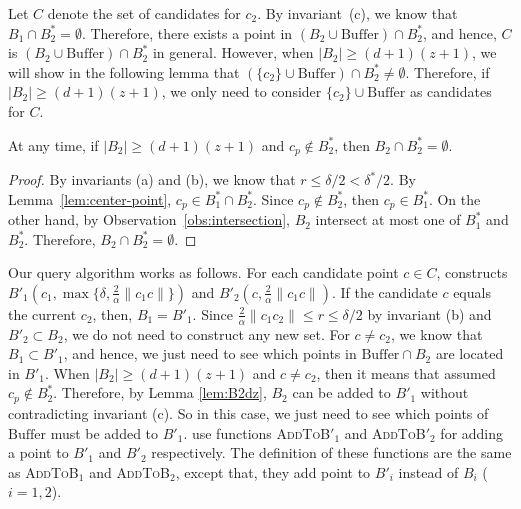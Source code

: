 \documentclass[envcountsame]{cls/cccg15}
\newcommand{\cp}{c_p}
\newcommand{\dz}{(d + 1)(z + 1)}
\newcommand{\Buffer}{\ensuremath{\text{Buffer}}}
\newcommand{\textproc}{\textsc}
\newcommand{\len}[1]{\|{#1}\|}
\newcommand{\radius}[1]{\frac{2}{\alpha} \len{c_1 #1}}
\newcommand{\lee}{\leqslant}
\newcommand{\gee}{\geqslant}
\renewcommand{\leq}{\lee}
\renewcommand{\geq}{\gee}
\renewcommand{\ge}{\gee}
\begin{document}
Let $C$ denote the set of candidates for $c_2$.
By invariant~(c), we know that $B_1 \cap B_2^* = \emptyset$. 
Therefore, there exists a point in $(B_2 \cup \Buffer) \cap B_2^*$,
and hence, $C$ is $(B_2 \cup \Buffer) \cap B_2^*$ in general.
However, when $|B_2| \geq \dz$, 
we will show in the following lemma that $(\{c_2\} \cup \Buffer) \cap B_2^* \neq \emptyset$. 
Therefore, if $|B_2| \ge \dz$, 
we only need to consider $\{c_2\} \cup \Buffer$ as candidates for $C$.



\begin{lemma}
\label{lem:B2dz}
	At any time, 
	if $|B_2| \ge \dz$ and $\cp \not\in B_2^*$,
	then $B_2 \cap B_2^* = \emptyset$.
\end{lemma}

\begin{proof}
	By invariants (a) and (b), we know that $r \leq \delta/2 < \delta^*/2$. 
	By Lemma~\ref{lem:center-point}, $c_p \in B_1^* \cap B_2^*$. 
	Since $c_p \not \in B_2^*$, then $c_p \in B_1^*$. 
	On the other hand, by Observation~\ref{obs:intersection}, 
	$B_2$ intersect at most one of $B_1^*$ and $B_2^*$. 
	Therefore, $B_2 \cap B_2^* = \emptyset$.
\end{proof}

\noindent
Our query algorithm works as follows. 
For each candidate point $c \in C$,  
constructs $B'_1(c_1, \max \{\delta, \radius{c} \})$ and $B'_2(c, \radius{c})$. 
If the candidate $c$ equals the current $c_2$, then, $B_1 = B'_1$. 
Since $\radius{c_2} \leq r \leq \delta/2$ by invariant (b) and $B'_2 \subset B_2$,
we do not need to construct any new set. 
For $c \neq c_2$, we know that $B_1 \subset B'_1$, and hence,
we just need to see which points in $\Buffer \cap B_2$ are located in $B'_1$.
When $|B_2| \geq \dz$ and $c \neq c_2$, then it means that assumed $c_p \not \in B_2^*$. 
Therefore, by Lemma \ref{lem:B2dz}, $B_2$ can be added to $B'_1$ without contradicting invariant (c). 
So in this case, we just need to see which points of $\Buffer$ must be added to $B'_1$. 
 use functions \textproc{AddToB$'_1$} and \textproc{AddToB$'_2$} for adding a point to $B'_1$ and $B'_2$ respectively. 
The definition of these functions are the same as \textproc{AddToB$_1$} and \textproc{AddToB$_2$},
except that, they add point to $B'_i$ instead of $B_i$ ($i = 1, 2$).
\end{document}
